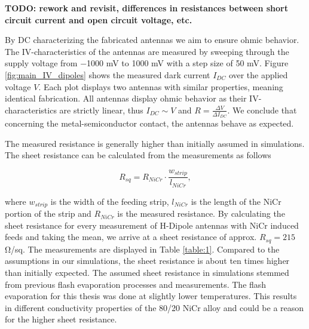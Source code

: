 \textbf{TODO: rework and revisit, differences in resistances between short circuit current and open circuit voltage, etc.}

By DC characterizing the fabricated antennas we aim to ensure ohmic behavior. The IV-characteristics of the antennas are measured by sweeping through the supply voltage from \num{-1000} \si{\milli \volt} to \num{1000} \si{\milli \volt} with a step size of \num{50} \si{\milli \volt}. Figure \ref{fig:main_IV_dipoles} shows the measured dark current $I_{DC}$ over the applied voltage $V$. Each plot displays two antennas with similar properties, meaning identical fabrication. All antennas display ohmic behavior as their IV-characteristics are strictly linear, thus $I_{DC} \sim V$ and $R = \frac{\Delta V}{\Delta I_{DC}}$. We conclude that concerning the metal-semiconductor contact, the antennas behave as expected.  

The measured resistance is generally higher than initially assumed in simulations. The sheet resistance can be calculated from the measurements as follows

\begin{equation}
    R_{sq} = R_{NiCr}\cdot\frac{w_{strip}}{l_{NiCr}},
\end{equation}

where $w_{strip}$ is the width of the feeding strip, $l_{NiCr}$ is the length of the NiCr portion of the strip and $R_{NiCr}$ is the measured resistance. By calculating the sheet resistance for every measurement of H-Dipole antennas with NiCr induced feeds and taking the mean, we arrive at a sheet resistance of approx. $R_{sq} = 215$ \si{\ohm/sq}. The measurements are displayed in Table \ref{table:1}. Compared to the assumptions in our simulations, the sheet resistance is about ten times higher than initially expected. The assumed sheet resistance in simulations stemmed from previous flash evaporation processes and measurements. The flash evaporation for this thesis was done at slightly lower temperatures. This results in different conductivity properties of the \num{80}/\num{20} NiCr alloy and could be a reason for the higher sheet resistance.

